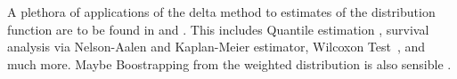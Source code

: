 A plethora of applications of the delta method to estimates of the distribution function are to be found in \cite{Vaart2000} and \cite{vaart2013}.
This includes Quantile estimation \cite[§21]{Vaart2000}\cite[§3.9.21/24]{vaart2013},
survival analysis via Nelson-Aalen and Kaplan-Meier estimator\cite[§3.9.19/31]{vaart2013},
Wilcoxon Test~\cite[§3.9.4.1]{vaart2013},
and much more.
Maybe Boostrapping from the weighted distribution is also sensible .
